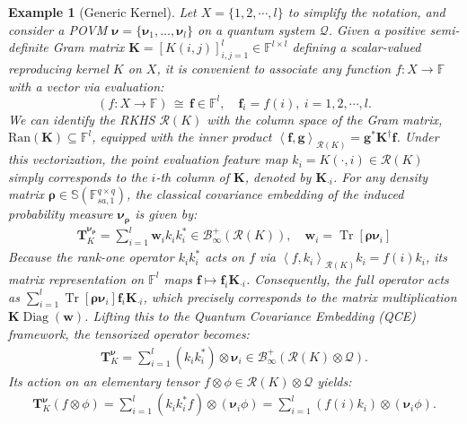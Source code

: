 \documentclass[noinfoline]{imsart}\setcounter{tocdepth}{2}
\renewcommand{\b}[1]{\mathbb{#1}} %
\newcommand{\m}[1]{\mathbf{#1}} %
\renewcommand{\c}[1]{\mathcal{#1}} %
\newcommand{\mb}[1]{\boldsymbol{#1}} %
\newcommand{\tr}[1]{\operatorname{Tr}\left[#1\right]}
\newcommand{\innpr}[2]{{\left\langle {#1},{#2}\right\rangle}} %
\newcommand{\Diag}{\operatorname{Diag}}
\theoremstyle{plain}
\newtheorem{example}[theorem]{Example}
\begin{document}
\begin{appendix}
\begin{example}[Generic Kernel]\label{ex:disc:kern}
Let $X = \{1, 2, \cdots, l \}$ to simplify the notation, and consider a POVM $\mb{\nu} = \{\mb{\nu}_1, \dots, \mb{\nu}_l\}$ on a quantum system $\c{Q}$. Given a positive semi-definite Gram matrix $\m{K} = [K(i, j)]_{i, j =1}^{l} \in \b{F}^{l \times l}$ defining a scalar-valued reproducing kernel $K$ on $X$, it is convenient to associate any function $f: X \to \b{F}$ with a vector via evaluation:
\begin{equation*}
    (f: X \to \b{F}) \, \cong \, \m{f} \in \b{F}^{l}, \quad \m{f}_{i} = f(i), \ i=1, 2, \cdots, l.
\end{equation*}
We can identify the RKHS $\c{R}(K)$ with the column space of the Gram matrix, $\mathrm{Ran}(\m{K}) \subseteq \b{F}^{l}$, equipped with the inner product $\innpr{\m{f}}{\m{g}}_{\c{R}(K)} = \m{g}^{*} \m{K}^{\dagger} \m{f}$. Under this vectorization, the point evaluation feature map $k_i = K(\cdot, i) \in \c{R}(K)$ simply corresponds to the $i$-th column of $\m{K}$, denoted by $\m{K}_{\cdot i}$. 
For any density matrix $\mb{\rho} \in \b{S}(\b{F}_{sa, 1}^{q \times q})$, the classical covariance embedding of the induced probability measure $\mb{\nu}_{\mb{\rho}}$ is given by:
\begin{align*}
    \m{T}_{K}^{\mb{\nu}_{\mb{\rho}}} = \sum_{i=1}^{l} \m{w}_{i} k_{i} k_{i}^{*} \in \c{B}_{\infty}^{+}(\c{R}(K)), \quad \m{w}_{i} = \tr{\mb{\rho} \mb{\nu}_{i}} 
\end{align*}
Because the rank-one operator $k_{i} k_{i}^{*}$ acts on $f$ via $\innpr{f}{k_i}_{\c{R}(K)} k_{i} = f(i) k_{i}$, its matrix representation on $\b{F}^{l}$ maps $\m{f} \mapsto \m{f}_{i} \m{K}_{\cdot i}$. Consequently, the full operator acts as $\sum_{i=1}^{l} \tr{\mb{\rho} \mb{\nu}_{i}} \m{f}_{i} \m{K}_{\cdot i}$, which precisely corresponds to the matrix multiplication $\m{K} \Diag(\m{w})$.
Lifting this to the Quantum Covariance Embedding (QCE) framework, the tensorized operator becomes:
\begin{align*}
    \m{T}_{K}^{\mb{\nu}} = \sum_{i=1}^{l} (k_{i} k_{i}^{*}) \otimes \mb{\nu}_{i} \in \c{B}_{\infty}^{+}(\c{R}(K) \otimes \c{Q}).
\end{align*}
Its action on an elementary tensor $f \otimes \phi \in \c{R}(K) \otimes \c{Q}$ yields:
\begin{align*}
    \m{T}_{K}^{\mb{\nu}} (f \otimes \phi) = \sum_{i=1}^{l} (k_{i} k_{i}^{*} f) \otimes (\mb{\nu}_{i} \phi) = \sum_{i=1}^{l} (f(i) k_{i}) \otimes (\mb{\nu}_{i} \phi).
\end{align*}

\end{example}
\end{appendix}
\end{document}

